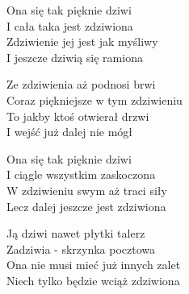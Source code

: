 \begin{text}
    Ona się tak pięknie dziwi\\
    I cała taka jest zdziwiona\\
    Zdziwienie jej jest jak myśliwy\\
    I jeszcze dziwią się ramiona

    Ze zdziwienia aż podnosi brwi\\
    Coraz piękniejsze w tym zdziwieniu\\
    To jakby ktoś otwierał drzwi\\
    I wejść już dalej nie mógł

    Ona się tak pięknie dziwi\\
    I ciągle wszystkim zaskoczona\\
    W zdziwieniu swym aż traci siły\\
    Lecz dalej jeszcze jest zdziwiona

    Ją dziwi nawet płytki talerz\\
    Zadziwia - skrzynka pocztowa\\
    Ona nie musi mieć już innych zalet\\
    Niech tylko będzie wciąż zdziwiona
\end{text}
\begin{chord}

\end{chord}